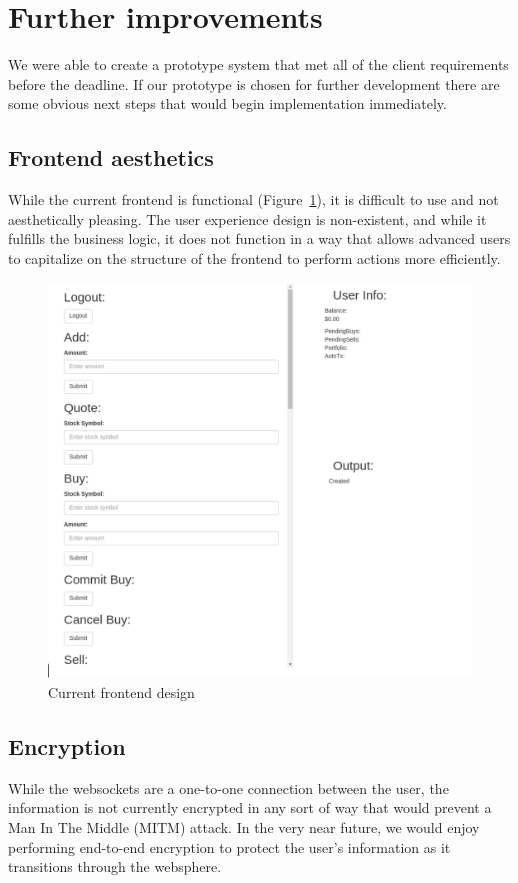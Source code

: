 \section{Further improvements}
We were able to create a prototype system that met all of the client requirements before the deadline.
If our prototype is chosen for further development there are some obvious next steps that would begin implementation immediately.

\subsection{Frontend aesthetics}
While the current frontend is functional (Figure~\ref{fig:fe}), it is difficult to use and not aesthetically pleasing. The user experience design is non-existent, and while it fulfills the business logic, it does not function in a way that allows advanced users to capitalize on the structure of the frontend to perform actions more efficiently.

\begin{figure}[tbph]
  \centering
  \includegraphics[width=0.7\linewidth]{graphics/fe}
  \caption{Current frontend design}
  \label{fig:fe}
\end{figure}

\subsection{Encryption}
While the websockets are a one-to-one connection between the user, the information is not currently encrypted in any sort of way that would prevent a Man In The Middle (MITM) attack. In the very near future, we would enjoy performing end-to-end encryption to protect the user's information as it transitions through the websphere.

